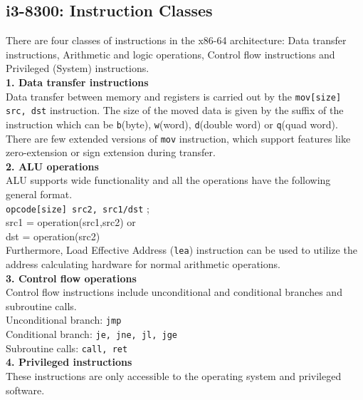 \documentclass[a4paper,11pt]{article}
\begin{document}
\subsection{i3-8300: Instruction Classes}
There are four classes of instructions in the x86-64 architecture: Data transfer instructions, Arithmetic and logic operations, Control flow instructions and Privileged (System) instructions.\\
\textbf{1. Data transfer instructions}\\
Data transfer between memory and registers is carried out by the {\tt mov[size] src, dst} instruction. The size of the moved data is given by the suffix of the instruction which can be {\tt b}(byte), {\tt w}(word), {\tt d}(double word) or {\tt q}(quad word). There are few extended versions of {\tt mov} instruction, which support features like zero-extension or sign extension during transfer.\\
\textbf{2. ALU operations}\\
ALU supports wide functionality and all the operations have the following general format.\\
{\tt opcode[size] src2, src1/dst} ;\\
src1 = operation(src1,src2) or\\dst = operation(src2)\\
Furthermore, Load Effective Address ({\tt lea}) instruction can be used to utilize the address calculating hardware for normal arithmetic operations.\\
\textbf{3. Control flow operations}\\
Control flow instructions include unconditional and conditional branches and subroutine calls.\\
Unconditional branch: {\tt jmp}\\
Conditional branch: {\tt je, jne, jl, jge}\\
Subroutine calls: {\tt call, ret}\\
\textbf{4. Privileged instructions}\\
These instructions are only accessible to the operating system and privileged software.
\end{document}
